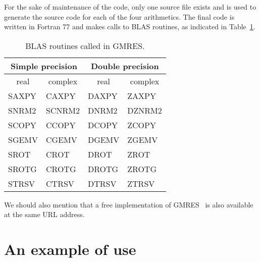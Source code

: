 %
%
For the sake of maintenance of the code, only one source file exists
and is used to generate the source code for each of the four arithmetics.
The final code is written in Fortran 77 and makes calls to BLAS
routines, as indicated in Table~\ref{tab:blas}.
%
%
\begin{table}[!ht]
\renewcommand{\arraystretch}{1.3}
\begin{center}
\begin{tabular}{|l|l|l|l|}
\hline
\multicolumn{2}{|c|}{Simple precision} & \multicolumn{2}{c|}{Double
precision} \\
\hline
\multicolumn{1}{|c|}{real} & \multicolumn{1}{c|}{complex} &
\multicolumn{1}{c|}{real} & \multicolumn{1}{c|}{complex} \\
\hline
    SAXPY  &  CAXPY &    DAXPY   &   ZAXPY    \\
    SNRM2  &  SCNRM2&    DNRM2   &   DZNRM2    \\
    SCOPY  &  CCOPY &    DCOPY   &   ZCOPY    \\
    SGEMV  &  CGEMV &    DGEMV   &   ZGEMV    \\
    SROT   &  CROT  &    DROT    &   ZROT     \\
    SROTG  &  CROTG &    DROTG   &   ZROTG    \\
    STRSV  &  CTRSV &    DTRSV   &   ZTRSV    \\
\hline
\end{tabular}
\caption{BLAS routines called in GMRES.}
\label{tab:blas}
\end{center}
\end{table}
We should also mention that a free implementation of 
GMRES~\cite{fggl:03,fggl:05} is also
available at the same URL address.

\section{An example of use}\label{sec:example}
%

